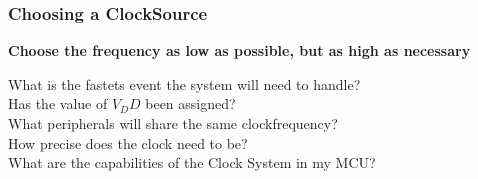 \subsubsection{Choosing a ClockSource }
\begin{center}
    \begin{minipage}{15cm}
        \centering
        \textbf{Choose the frequency as low as possible, but as high as necessary}
    \end{minipage}
\end{center}
\vspace{-0.5cm}
What is the fastets event the system will need to handle?\\
Has the value of $ V_DD $ been assigned?\\
What peripherals will share the same clockfrequency?\\
How precise does the clock need to be?\\
What are the capabilities of the Clock System in my MCU?

